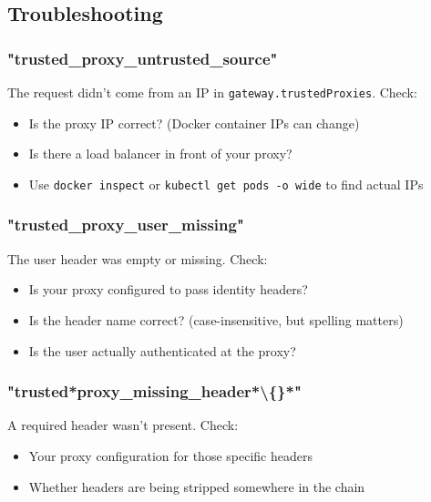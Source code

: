 \subsection{Troubleshooting}


\subsubsection{"trusted\_proxy\_untrusted\_source"}


The request didn't come from an IP in \texttt{gateway.trustedProxies}. Check:

\begin{itemize}
  \item Is the proxy IP correct? (Docker container IPs can change)
  \item Is there a load balancer in front of your proxy?
  \item Use \texttt{docker inspect} or \texttt{kubectl get pods -o wide} to find actual IPs
\end{itemize}


\subsubsection{"trusted\_proxy\_user\_missing"}


The user header was empty or missing. Check:

\begin{itemize}
  \item Is your proxy configured to pass identity headers?
  \item Is the header name correct? (case-insensitive, but spelling matters)
  \item Is the user actually authenticated at the proxy?
\end{itemize}


\subsubsection{"trusted*proxy\_missing\_header*\textbackslash\{\}*"}


A required header wasn't present. Check:

\begin{itemize}
  \item Your proxy configuration for those specific headers
  \item Whether headers are being stripped somewhere in the chain
\end{itemize}


